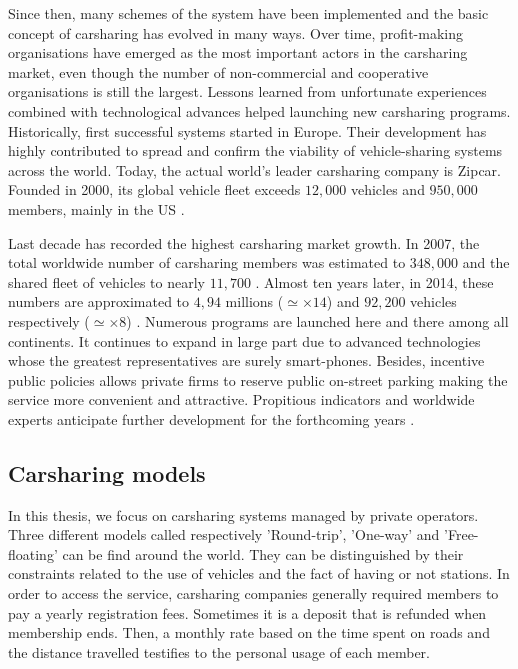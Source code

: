 \begin{bibunit}[ieeetr]
\medskip
Since then, many schemes of the system have been implemented and the basic concept of carsharing has evolved in many ways.
Over time, profit-making organisations have emerged as the most important actors in the carsharing market, even though the number of non-commercial and cooperative organisations is still the largest.
Lessons learned from unfortunate experiences combined with technological advances helped launching new carsharing programs.
Historically, first successful systems started in Europe.
Their development has highly contributed to spread and confirm the viability of vehicle-sharing systems across the world.
Today, the actual world's leader carsharing company is Zipcar.
Founded in 2000, its global vehicle fleet exceeds $12,000$ vehicles and $950,000$ members, mainly in the US \cite{zipcar_website}.

\medskip
Last decade has recorded the highest carsharing market growth.
In 2007, the total worldwide number of carsharing members was estimated to $348,000$ and the shared fleet of vehicles to nearly $11,700$ \cite{shaheen_growth_2007}.
Almost ten years later, in 2014, these numbers are approximated to $4,94$ millions ($\simeq \times 14$) and $92,200$ vehicles respectively ($\simeq \times 8$) \cite{statista_carsharingNumbers}.
Numerous programs are launched here and there among all continents.
It continues to expand in large part due to advanced technologies whose the greatest representatives are surely smart-phones.
Besides, incentive public policies allows private firms to reserve public on-street parking making the service more convenient and attractive.
Propitious indicators and worldwide experts anticipate further development for the forthcoming years \cite{shaheen_carsharing_2013}.







\subsection{Carsharing models}
In this thesis, we focus on carsharing systems managed by private operators.
Three different models called respectively 'Round-trip', 'One-way' and 'Free-floating' can be find around the world.
They can be distinguished by their constraints related to the use of vehicles and the fact of having or not stations.
In order to access the service, carsharing companies generally required members to pay a yearly registration fees.
Sometimes it is a deposit that is refunded when membership ends.
Then, a monthly rate based on the time spent on roads and the distance travelled testifies to the personal usage of each member.


\end{bibunit}
